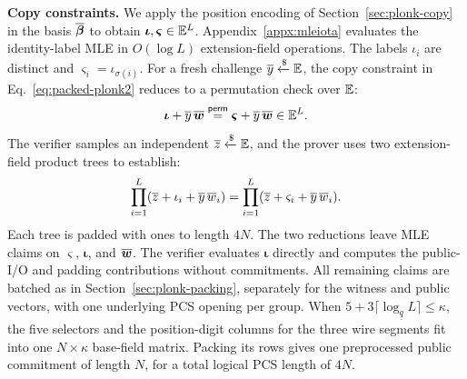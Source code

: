 \smallskip\noindent\textbf{Copy constraints.}
We apply the position encoding of Section~\ref{sec:plonk-copy}
in the basis \(\overline{\bm\beta}\) to obtain
\(\bm\iota,\bm\varsigma\in\mathbb{E}^L\).
Appendix~\ref{appx:mleiota} evaluates the identity-label MLE
in \(O(\log L)\) extension-field operations.
The labels \(\iota_i\) are distinct and
\(\varsigma_i=\iota_{\sigma(i)}\).
For a fresh challenge \(\overline{y}\mathrel{\xleftarrow{\$}}\mathbb{E}\),
the copy constraint in Eq.~\eqref{eq:packed-plonk2} reduces
to a permutation check over $\mathbb{E}$:
\[
    \bm\iota+\overline{y}\,\overline{\bm w}
       \stackrel{\mathsf{perm}}{=}
    \bm\varsigma+\overline{y}\,\overline{\bm w} \in \mathbb{E}^L.
\]
The verifier samples an independent
\(\overline{z}\mathrel{\xleftarrow{\$}}\mathbb{E}\), and the prover uses two
extension-field product trees to establish:
\[
    \prod_{i=1}^{L}(\overline{z}+\iota_i+\overline{y}\,\overline{w}_i)
       =
    \prod_{i=1}^{L}(\overline{z}+\varsigma_i+\overline{y}\,\overline{w}_i).
\]
Each tree is padded with ones to length \(4N\).
The two reductions leave MLE claims on \(\bm\varsigma\),
\(\bm\iota\), and \(\overline{\bm w}\).
The verifier evaluates \(\bm\iota\) directly and computes the
public-I/O and padding contributions without commitments.
All remaining claims are batched as in
Section~\ref{sec:plonk-packing}, separately for the witness
and public vectors, with one underlying PCS opening per group.
When \(5+3\lceil\log_{\underline q}L\rceil\leq\kappa\),
the five selectors and the position-digit columns for the three
wire segments fit into one \(N\times\kappa\) base-field matrix.
Packing its rows gives one preprocessed public commitment of
length \(N\), for a total logical PCS length of \(4N\).

